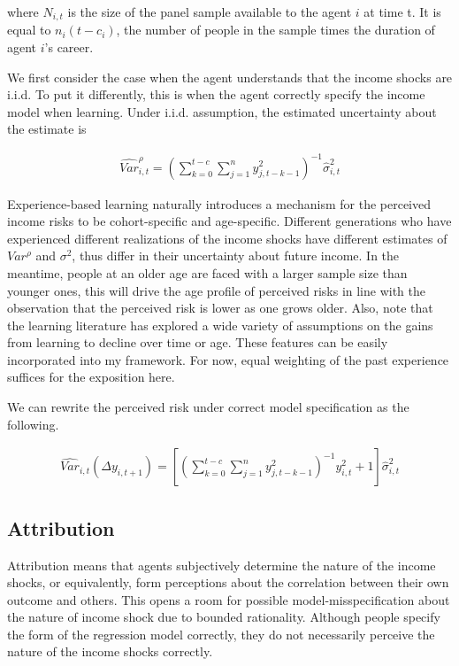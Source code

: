 \documentclass[12pt,notitlepage,onecolumn,aps,pra]{article}
\begin{document}
where \(N_{i,t}\) is the size of the panel sample available to the agent
\(i\) at time t. It is equal to \(n_{i}(t-c_{i})\), the number of people
in the sample times the duration of agent \(i\)'s career.

We first consider the case when the agent understands that the income
shocks are i.i.d. To put it differently, this is when the agent
correctly specify the income model when learning. Under i.i.d.
assumption, the estimated uncertainty about the estimate is

\begin{eqnarray}
\widehat {Var}^{\rho}_{i,t} = (\sum^{t-c}_{k=0}\sum^{n}_{j=1}y^2_{j,t-k-1})^{-1}\widehat{\sigma}^2_{i,t}
\end{eqnarray}

Experience-based learning naturally introduces a mechanism for the
perceived income risks to be cohort-specific and age-specific. Different
generations who have experienced different realizations of the income
shocks have different estimates of \(Var^{\rho}\) and \(\sigma^2\), thus
differ in their uncertainty about future income. In the meantime, people
at an older age are faced with a larger sample size than younger ones,
this will drive the age profile of perceived risks in line with the
observation that the perceived risk is lower as one grows older. Also,
note that the learning literature has explored a wide variety of
assumptions on the gains from learning to decline over time or age.
These features can be easily incorporated into my framework. For now,
equal weighting of the past experience suffices for the exposition here.

We can rewrite the perceived risk under correct model specification as
the following.

\begin{eqnarray}
\widehat{Var}_{i,t}(\Delta y_{i,t+1}) = [(\sum^{t-c}_{k=0}\sum^{n}_{j=1}y^2_{j,t-k-1})^{-1}y^2_{i,t} + 1] \hat{\sigma}^2_{i,t}
\end{eqnarray}

    \hypertarget{attribution}{%
\subsection{Attribution}\label{attribution}}

Attribution means that agents subjectively determine the nature of the
income shocks, or equivalently, form perceptions about the correlation
between their own outcome and others. This opens a room for possible
model-misspecification about the nature of income shock due to bounded
rationality. Although people specify the form of the regression model
correctly, they do not necessarily perceive the nature of the income
shocks correctly.
\end{document}

